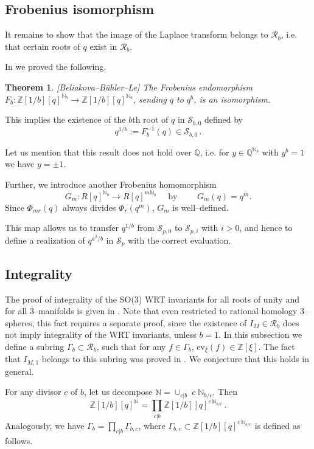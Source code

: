 \documentclass[12pt]{amsart}
\theoremstyle{plain}
\newtheorem{Thm}{Theorem}
\theoremstyle{definition}
\def\BZ{\mathbb Z}
\def\BQ{\mathbb Q}
\def\N{{\mathbb N}}
\def\R{\mathcal R}
\def\calS{\mathcal S}
\def\Z{\BZ}
\def\Q{\BQ}
\def\ev{\mathrm{ev}}
\begin{document}
\subsection{Frobenius isomorphism}
It remains to
show that the image of the
Laplace transform
belongs to $\R_b$, i.e. that
certain roots of $q$ exist in $\R_b$.


In \cite{BBL} we proved the following.


\begin{Thm}\label{frob}{\rm [Beliakova--B\"uhler--Le]}
The Frobenius endomorphism
 $F_b: \Z[1/b][q]^{\N_b} \to \Z[1/b][q]^{\N_b}$, sending $q$ to $q^b$,
 is an isomorphism.
\end{Thm}


This implies the
existence of the $b$th root of $q$ in $\calS_{b,0}$
defined by
\[
q^{1/b}:=F^{-1}_b (q)  \in \calS_{b,0}\,.
\]



Let us mention that this result does not hold over $\Q$, i.e.
for  $y \in\Q^{\N_b}$ with $y^b=1$ we have $y=\pm 1$.

Further, we introduce
another Frobenius homomorphism
$$G_m : R[q]^{\N_b} \to R[q]^{m\N_b} \quad \text{ by } \qquad G_m(q) = q^m.$$
Since $\Phi_{mr}(q)$ always divides $\Phi_{r}(q^m)$,  $G_m$ is well--defined.

This map allows us to transfer $q^{1/b}$ from $\calS_{p,0}$
to $\calS_{p,i}$ with $i> 0$, and hence to define a
realization of $q^{a^2/b}$ in $\calS_p$ with the correct evaluation.


\subsection{Integrality}
The proof of integrality of the SO(3) WRT invariants for
all  roots of unity and for all 3--manifolds is given in \cite{BL}.
Note that even restricted to rational homology 3--spheres,
this fact requires a separate proof, since
 the existence
of $I_M \in \R_b$ does not imply  integrality of the WRT invariants,
unless $b= 1$. In this subsection
we define a subring $\Gamma_b \subset \R_b$, such that
for any $f\in \Gamma_b$, $\ev_\xi(f)\in \Z[\xi]$.
The fact that $I_{M,1}$ belongs
to this subring was proved in \cite{BL}. We conjecture that
this holds in general.

For any divisor $c$ of $b$, let us decompose
$\N=\cup_{c|b}\; c\; \N_{b/c}$. Then
$$\Z[1/b][q]^\N=\prod_{c|b} \Z[1/b][q]^{c\,\N_{b/c}}\, .$$
Analogously, we have
$\Gamma_b=\prod_{c|b} \Gamma_{b,c}$, where
$\Gamma_{b,c} \subset \Z[1/b][q]^{c\, \N_{b/c}}$ is defined as follows.
\end{document}
